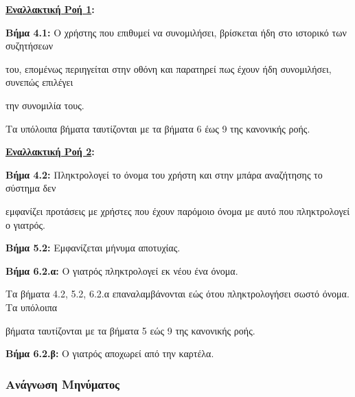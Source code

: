 \documentclass{article}
\begin{document}
 \textbf{\underline{Εναλλακτική Ροή 1}:} \vspace{0.2cm}
\par\textbf{Βήμα 4.1:} Ο χρήστης που επιθυμεί να συνομιλήσει, βρίσκεται ήδη στο ιστορικό των συζητήσεων \par του, επομένως περιηγείται στην οθόνη και παρατηρεί πως έχουν ήδη συνομιλήσει, συνεπώς επιλέγει \par την συνομιλία τους.  \vspace{0.1cm}

\par Τα υπόλοιπα βήματα ταυτίζονται με τα βήματα 6 έως 9 της κανονικής ροής.

\newpage

\textbf{\underline{Εναλλακτική Ροή 2}:} \vspace{0.2cm}
\par \textbf{Βήμα 4.2:} Πληκτρολογεί το όνομα του χρήστη και στην μπάρα αναζήτησης το σύστημα δεν \par εμφανίζει προτάσεις με χρήστες που έχουν παρόμοιο όνομα με αυτό που πληκτρολογεί ο γιατρός. \vspace{0.1cm}
\par \textbf{Βήμα 5.2:} Εμφανίζεται μήνυμα αποτυχίας. \vspace{0.1cm}
\par \textbf{Βήμα 6.2.α:} Ο γιατρός πληκτρολογεί εκ νέου ένα όνομα.\vspace{0.1cm}
\par Τα βήματα 4.2, 5.2, 6.2.α επαναλαμβάνονται εώς ότου πληκτρολογήσει σωστό όνομα. Τα υπόλοιπα \par βήματα ταυτίζονται με τα βήματα 5 εώς 9 της κανονικής ροής. \vspace{0.1cm}
\par \textbf{Βήμα 6.2.β:} Ο γιατρός αποχωρεί από την καρτέλα.

\subsubsection{Ανάγνωση Μηνύματος}
\end{document}

